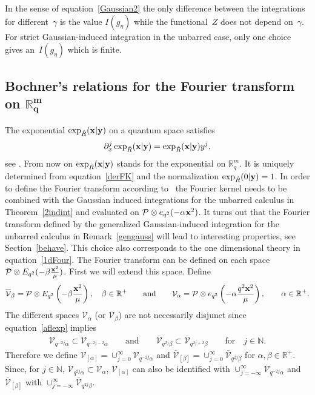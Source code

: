 \documentclass[11pt]{article}
\newcommand{\mR}{\mathbb{R}}
\newcommand{\mN}{\mathbb{N}}
\newcommand{\cP}{\mathcal{P}}
\newcommand{\cV}{\mathcal{V}}
\numberwithin{equation}{section}
\begin{document}
In the sense of equation~\eqref{Gaussian2} the only dif\/ference between the integrations for dif\/ferent~$\gamma$ is the value $I(g_\eta)$ while the functional~$Z$ does not depend on~$\gamma$. For strict Gaussian-induced integration in the unbarred case, only one choice gives an~$I(g_\eta)$ which is f\/inite.



\subsection[Bochner's relations for the Fourier transform on $\mR^m_q$]{Bochner's relations for the Fourier transform on $\boldsymbol{\mR^m_q}$}\label{boch}

The exponential $\exp_{\hat{R}}(\bold{x}|\bold{y})$ on a quantum space satisf\/ies
\begin{gather}
\label{derFK}
\partial_x^j\exp_{\hat{R}}(\bold{x}|\bold{y}) = \exp_{\hat{R}}(\bold{x}|\bold{y})y^j,
\end{gather}
see \cite{MR1303081, MR1235979, MR2099760}. From now on $\exp_{\hat{R}}(\bold{x}|\bold{y})$ stands for the exponential on $\mR^m_q$. It is uniquely determined from equation~\eqref{derFK} and the normalization $\exp_{\hat{R}}(0|\bold{y})=1$. In order to def\/ine the Fourier transform according to~\cite{MR1303081} the Fourier kernel needs to be combined with the Gaussian induced integrations for the unbarred calculus in Theorem~\ref{2indint} and evaluated on  $\cP\otimes e_{q^2}(-\alpha\bold{x}^2)$. It turns out that the Fourier transform def\/ined by the generalized Gaussian-induced integration for the unbarred calculus in Remark~\ref{gengauss} will lead to interesting properties, see Section~\ref{behave}. This choice also corresponds to the one dimensional theory in equation~\eqref{1dFour}. The Fourier transform can be def\/ined on each space $\cP\otimes E_{q^2}(-\beta \frac{\bold{x}^2}{\mu})$. First we will extend this space. Def\/ine
\begin{gather*}
\overline{\cV}_\beta =\cP\otimes E_{q^2}\left(-\beta \frac{\bold{x}^2}{\mu}\right),\quad\beta\in\mR^+ \qquad \mbox{and} \qquad \cV_\alpha=\cP\otimes e_{q^2}\left(-\alpha\frac{q^2\bold{x}^2}{\mu}\right),\qquad\alpha\in\mR^+.
\end{gather*}
The dif\/ferent spaces $\cV_\alpha$ (or $\overline{\cV}_\beta$) are not necessarily disjunct since equation~\eqref{aflexp} implies
\begin{gather*}
\cV_{q^{-2j}\alpha}\subset\cV_{q^{-2j-2}\alpha} \qquad \mbox{and} \qquad \overline{\cV}_{q^{2j}\beta}\subset\overline{\cV}_{q^{2j+2}\beta}\qquad\mbox{for}\quad j\in\mN.
\end{gather*}
Therefore we def\/ine $\cV_{[\alpha]}=\cup_{j=0}^\infty \cV_{q^{-2j}\alpha}$ and $\overline{\cV}_{[\beta]}=\cup_{j=0}^\infty \overline{\cV}_{q^{2j}\beta}$ for $\alpha,\beta\in\mR^+$. Since, for $j\in\mN$, $\cV_{q^{2j}\alpha}\subset\cV_{\alpha}$,  $\cV_{[\alpha]}$ can also be identif\/ied with $\cup_{j=-\infty}^\infty \cV_{q^{-2j}\alpha}$ and $\overline{\cV}_{[\beta]}$ with $\cup_{j=-\infty}^\infty \overline{\cV}_{q^{2j}\beta}$.
\end{document}
